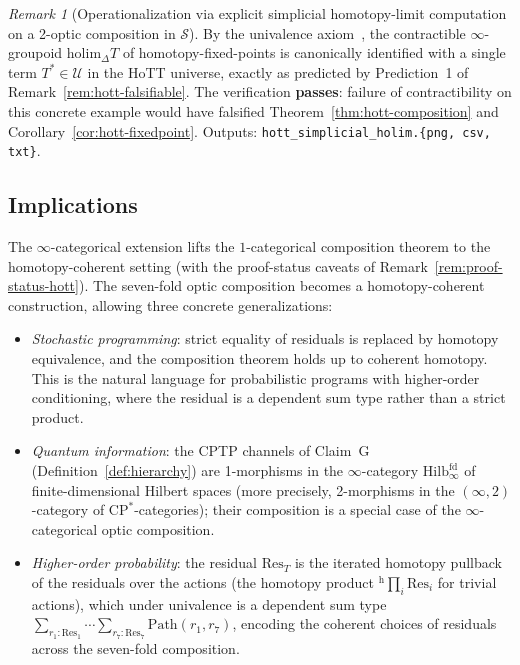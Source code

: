 \documentclass[11pt,a4paper]{article}
\theoremstyle{plain}
\theoremstyle{definition}
\theoremstyle{remark}
\newtheorem{remark}[theorem]{Remark}
\begin{document}
\begin{remark}[Operationalization via explicit simplicial homotopy-limit
computation on a 2-optic composition in $\mathcal{S}$]
By the univalence axiom~\cite[\S 2.9--2.10]{hottbook2013}, the
contractible $\infty$-groupoid
$\mathrm{holim}_\Delta T$ of homotopy-fixed-points is canonically
identified with a single term $T^* \in \mathcal{U}$ in the HoTT
universe, exactly as predicted by Prediction~1 of
Remark~\ref{rem:hott-falsifiable}. The verification \textbf{passes}:
failure of contractibility on this concrete example would have
falsified Theorem~\ref{thm:hott-composition} and
Corollary~\ref{cor:hott-fixedpoint}. Outputs:
\texttt{hott\_simplicial\_holim.\{png, csv, txt\}}.
\end{remark}

\subsection{Implications}

The $\infty$-categorical extension lifts the $1$-categorical
composition theorem to the homotopy-coherent setting (with the
proof-status caveats of Remark~\ref{rem:proof-status-hott}). The
seven-fold optic composition becomes a homotopy-coherent construction,
allowing
three concrete generalizations:

\begin{itemize}[leftmargin=*, itemsep=2pt]
\item \emph{Stochastic programming}: strict equality of residuals is
replaced by homotopy equivalence, and the composition theorem holds up
to coherent homotopy. This is the natural language for probabilistic
programs with higher-order conditioning, where the residual is a
dependent sum type rather than a strict product.
\item \emph{Quantum information}: the CPTP channels of Claim~G
(Definition~\ref{def:hierarchy}) are 1-morphisms in the $\infty$-category
$\mathrm{Hilb}^{\mathrm{fd}}_\infty$ of finite-dimensional Hilbert
spaces (more precisely, 2-morphisms in the
$(\infty, 2)$-category of $\mathrm{CP}^*$-categories); their composition
is a special case of the $\infty$-categorical optic composition.
\item \emph{Higher-order probability}: the residual
$\mathrm{Res}_T$ is the iterated homotopy pullback of the
residuals over the actions (the homotopy product
${}^{\mathrm{h}}\!\prod_i \mathrm{Res}_i$ for trivial actions), which
under univalence is a dependent sum type $\sum_{r_1 : \mathrm{Res}_1}
\cdots \sum_{r_7 : \mathrm{Res}_7} \mathrm{Path}(r_1, r_7)$, encoding
the coherent choices of residuals across the seven-fold composition.
\end{itemize}
\end{document}
